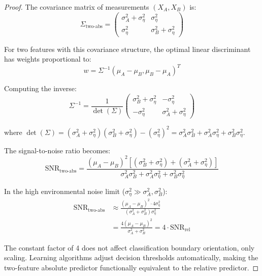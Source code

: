 \begin{proof}
The covariance matrix of measurements $(X_A, X_B)$ is:
\begin{equation}
\Sigma_{\text{two-abs}} = \begin{pmatrix} 
\sigma_A^2 + \sigma_\eta^2 & \sigma_\eta^2 \\
\sigma_\eta^2 & \sigma_B^2 + \sigma_\eta^2 
\end{pmatrix}
\end{equation}

For two features with this covariance structure, the optimal linear discriminant has weights proportional to:
\begin{equation}
w = \Sigma^{-1}(\mu_A - \mu_B, \mu_B - \mu_A)^T
\end{equation}

Computing the inverse:
\begin{equation}
\Sigma^{-1} = \frac{1}{\det(\Sigma)} \begin{pmatrix} 
\sigma_B^2 + \sigma_\eta^2 & -\sigma_\eta^2 \\
-\sigma_\eta^2 & \sigma_A^2 + \sigma_\eta^2 
\end{pmatrix}
\end{equation}

where $\det(\Sigma) = (\sigma_A^2 + \sigma_\eta^2)(\sigma_B^2 + \sigma_\eta^2) - (\sigma_\eta^2)^2 = \sigma_A^2\sigma_B^2 + \sigma_A^2\sigma_\eta^2 + \sigma_B^2\sigma_\eta^2$.

The signal-to-noise ratio becomes:
\begin{equation}
\text{SNR}_{\text{two-abs}} = \frac{(\mu_A - \mu_B)^2[(\sigma_B^2 + \sigma_\eta^2) + (\sigma_A^2 + \sigma_\eta^2)]}{\sigma_A^2\sigma_B^2 + \sigma_A^2\sigma_\eta^2 + \sigma_B^2\sigma_\eta^2}
\end{equation}

In the high environmental noise limit ($\sigma_\eta^2 \gg \sigma_A^2, \sigma_B^2$):
\begin{align}
\text{SNR}_{\text{two-abs}} &\approx \frac{(\mu_A - \mu_B)^2 \cdot 4\sigma_\eta^2}{(\sigma_A^2 + \sigma_B^2)\sigma_\eta^2} \nonumber\\
&= \frac{4(\mu_A - \mu_B)^2}{\sigma_A^2 + \sigma_B^2} = 4 \cdot \text{SNR}_{\text{rel}}
\end{align}

The constant factor of 4 does not affect classification boundary orientation, only scaling. Learning algorithms adjust decision thresholds automatically, making the two-feature absolute predictor functionally equivalent to the relative predictor.
\end{proof}

